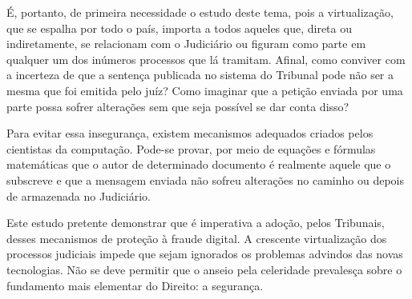   É, portanto, de primeira necessidade o estudo deste tema, pois
  a virtualização, que se espalha por todo o país, importa a
  todos aqueles que, direta ou indiretamente, se relacionam com o
  Judiciário ou figuram como parte em qualquer um dos inúmeros
  processos que lá tramitam. Afinal, como conviver com a
  incerteza de que a sentença publicada no sistema do Tribunal
  pode não ser a mesma que foi emitida pelo juíz? Como imaginar
  que a petição enviada por uma parte possa sofrer alterações sem
  que seja possível se dar conta disso?\par

  Para evitar essa insegurança, existem mecanismos adequados
  criados pelos cientistas da computação. Pode-se provar, por
  meio de equações e fórmulas matemáticas que o autor de
  determinado documento é realmente aquele que o subscreve e que
  a mensagem enviada não sofreu alterações no caminho ou depois
  de armazenada no Judiciário.\par

  Este estudo pretente demonstrar que é imperativa a adoção,
  pelos Tribunais, desses mecanismos de proteção à fraude
  digital. A crescente virtualização dos processos judiciais
  impede que sejam ignorados os problemas advindos das novas
  tecnologias. Não se deve permitir que o anseio pela celeridade
  prevalesça sobre o fundamento mais elementar do Direito: a
  segurança.
